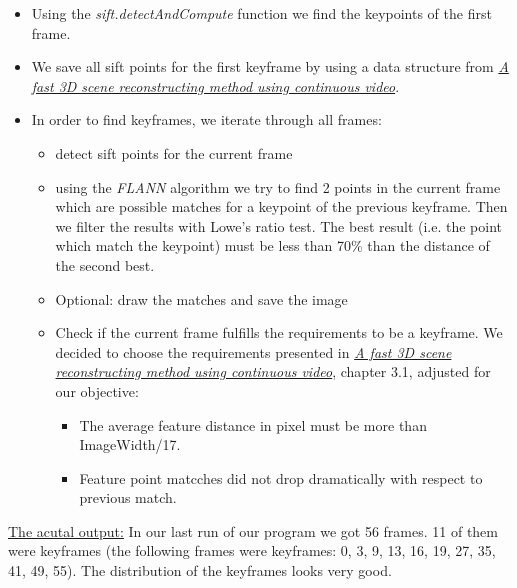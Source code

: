 \documentclass[paper=a4, fontsize=11pt]{scrartcl}
\numberwithin{equation}{section}		%
\numberwithin{figure}{section}			%
\numberwithin{table}{section}				%
\begin{document}
\begin{itemize}
\item Using the \emph{sift.detectAndCompute} function we find the keypoints of the first frame.
\item We save all sift points for the first keyframe by using a data structure from \emph{\href{https://jivp-eurasipjournals.springeropen.com/track/pdf/10.1186/s13640-017-0168-3}{A fast 3D scene reconstructing method using continuous video}}.
\item  In order to find keyframes, we iterate through all frames:
\begin{itemize}
\item detect sift points for the current frame
\item using the \emph{FLANN} algorithm we try to find 2 points in the current frame which are possible matches for a keypoint of the previous keyframe. Then we filter the results with Lowe's ratio test. The best result (i.e. the point which match the keypoint) must be less than 70\% than the distance of the second best.
\item Optional: draw the matches and save the image
\item Check if the current frame fulfills the requirements to be a keyframe. We decided to choose the requirements presented in \emph{\href{https://jivp-eurasipjournals.springeropen.com/track/pdf/10.1186/s13640-017-0168-3}{A fast 3D scene reconstructing method using continuous video}}, chapter 3.1, adjusted for our objective:
\begin{itemize}
\item The average feature distance in pixel must be more than ImageWidth/17.
\item Feature point matcches did not drop dramatically with respect to previous match.
\end{itemize}
\end{itemize}
\end{itemize}
\underline{The acutal output:} In our last run of our program we got 56 frames. 11 of them were keyframes (the following frames were keyframes: 0, 3, 9, 13, 16, 19, 27, 35, 41, 49, 55). The distribution of the keyframes looks very good.
\end{document}
